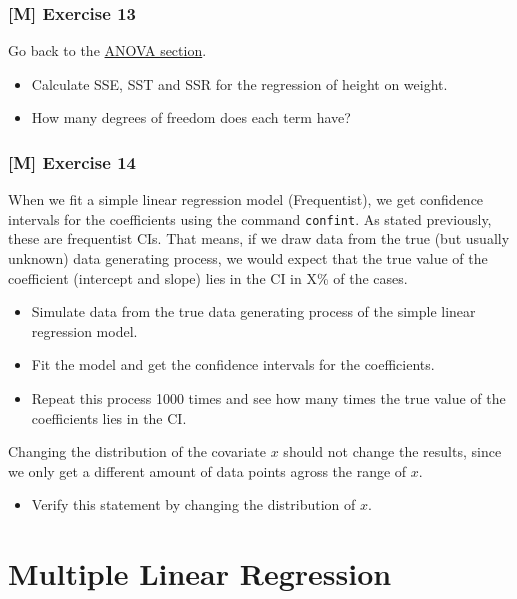 \documentclass[
]{book}
\providecommand{\tightlist}{%
  \setlength{\itemsep}{0pt}\setlength{\parskip}{0pt}}
\begin{document}
\subsection{{[}M{]} Exercise 13}\label{exercise13_simpl_lin_reg}

Go back to the \hyperref[analysis_of_variance]{ANOVA section}.

\begin{itemize}
\item
  Calculate SSE, SST and SSR for the regression of height on weight.
\item
  How many degrees of freedom does each term have?
\end{itemize}

\subsection{{[}M{]} Exercise 14}\label{exercise14_simpl_lin_reg}

When we fit a simple linear regression model (Frequentist), we get confidence intervals for the coefficients
using the command \texttt{confint}. As stated previously, these are frequentist CIs. That means,
if we draw data from the true (but usually unknown) data generating process, we would expect
that the true value of the coefficient (intercept and slope) lies in the CI in X\% of the cases.

\begin{itemize}
\tightlist
\item
  Simulate data from the true data generating process of the simple linear regression model.
\item
  Fit the model and get the confidence intervals for the coefficients.
\item
  Repeat this process 1000 times and see how many times the true value of the coefficients
  lies in the CI.
\end{itemize}

Changing the distribution of the covariate \(x\) should not change the results, since
we only get a different amount of data points agross the range of \(x\).

\begin{itemize}
\tightlist
\item
  Verify this statement by changing the distribution of \(x\).
\end{itemize}

\chapter{Multiple Linear Regression}\label{multiple-linear-regression}
\end{document}
